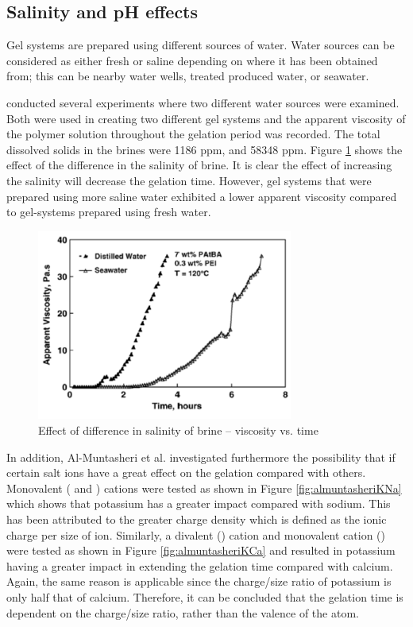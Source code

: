 \subsection{Salinity and pH effects}
Gel systems are prepared using different sources of water. Water sources can be considered as either fresh or saline depending on where it has been obtained from; this can be nearby water wells, treated produced water, or seawater.

\citet{Al-Muntasheri2007} conducted several experiments where two different water sources were examined. Both were used in creating two different gel systems and the apparent viscosity of the polymer solution throughout the gelation period was recorded. The total dissolved solids in the brines were 1186 ppm, and 58348 ppm. Figure \ref{fig:almuntasheriSal} shows the effect of the difference in the salinity of brine. It is clear the effect of increasing the salinity will decrease the gelation time. However, gel systems that were prepared using more saline water exhibited a lower apparent viscosity compared to gel-systems prepared using fresh water.

\begin{figure}
    \centering
    \includegraphics[width=0.75\textwidth]{img/fig/almuntasheriSal.png}
    \caption{Effect of difference in salinity of brine – viscosity vs. time \citep{Al-Muntasheri2007}}
    \label{fig:almuntasheriSal} %
\end{figure}

In addition, Al-Muntasheri et al. investigated furthermore the possibility that if certain salt ions have a great effect on the gelation compared with others. Monovalent ( and ) cations were tested as shown in Figure \ref{fig:almuntasheriKNa} which shows that potassium has a greater impact compared with sodium. This has been attributed to the greater charge density which is defined as the ionic charge per size of ion. Similarly, a divalent () cation and monovalent cation () were tested as shown in Figure \ref{fig:almuntasheriKCa} and resulted in potassium having a greater impact in extending the gelation time compared with calcium. Again, the same reason is applicable since the charge/size ratio of potassium is only half that of calcium. Therefore, it can be concluded that the gelation time is dependent on the charge/size ratio, rather than the valence of the atom.

